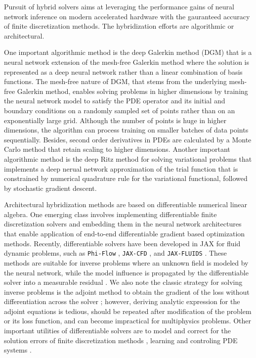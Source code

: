 \documentclass{elsarticle}
\begin{document}
Pursuit of hybrid solvers aims at leveraging the performance gains of neural network inference on modern accelerated hardware with the gauranteed accuracy of finite discretization methods. The hybridization efforts are algorithmic or architectural.

One important algorithmic method is the deep Galerkin method (DGM) \cite{SIRIGNANO20181339} that is a neural network extension of the mesh-free Galerkin method where the solution is represented as a deep neural network rather than a linear combination of basis functions. The mesh-free nature of DGM, that stems from the underlying mesh-free Galerkin method, enables solving problems in higher dimensions by training the neural network model to satisfy the PDE operator and its initial and boundary conditions on a randomly sampled set of points rather than on an exponentially large grid. Although the number of points is huge in higher dimensions, the algorithm can process training on smaller batches of data points sequentially. Besides, second order derivatives in PDEs are calculated by a Monte Carlo method that retain scaling to higher dimensions. Another important algorithmic method is the deep Ritz method for solving variational problems \cite{yu2018deep} that implements a deep nerual network approximation of the trial function that is constrained by numerical quadrature rule for the variational functional, followed by stochastic gradient descent.

Architectural hybridization methods are based on differentiable numerical linear algebra. One emerging class involves implementing differentiable finite discretization solvers and embedding them in the neural network architectures that enable application of end-to-end differentiable gradient based optimization methods. Recently, differentiable solvers have been developed in JAX \cite{jax2018github} for fluid dynamic problems, such as \texttt{Phi-Flow} \cite{holl2020phiflow}, \texttt{JAX-CFD} \cite{Kochkov2021-ML-CFD}, and \texttt{JAX-FLUIDS} \cite{bezgin2022jax}. These methods are suitable for inverse problems where an unknown field is modeled by the neural network, while the model influence is propagated by the differentiable solver into a measurable residual \cite{pakravan2021solving,dal2020data,lu2020extracting}. We also note the classic strategy for solving inverse problems is the adjoint method to obtain the gradient of the loss without differentiation across the solver \cite{berg2017neural}; however, deriving analytic expression for the adjoint equations is tedious, should be repeated after modification of the problem or its loss function, and can become impractical for multiphysics problems. Other important utilities of differentiable solvers are to model and correct for the solution errors of finite discretization methods \cite{um2020solver}, learning and controling PDE systems \cite{de2018end,holl2020learning}.
\end{document}
